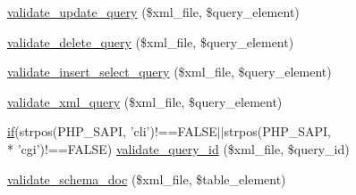 \begin{DoxyCompactItemize}
\item 
\hyperlink{validate_8php_af9c61a8b17e64da32042acf1f10a749e}{validate\+\_\+update\+\_\+query} (\$xml\+\_\+file, \$query\+\_\+element)
\item 
\hyperlink{validate_8php_a6cb78680a29c3df75fc0a7e083fb5b41}{validate\+\_\+delete\+\_\+query} (\$xml\+\_\+file, \$query\+\_\+element)
\item 
\hyperlink{validate_8php_ae38b9dcf816905b7fd3c4aeeeb4bfb27}{validate\+\_\+insert\+\_\+select\+\_\+query} (\$xml\+\_\+file, \$query\+\_\+element)
\item 
\hyperlink{validate_8php_a208d0609e6ad89408ad82c71b30e8611}{validate\+\_\+xml\+\_\+query} (\$xml\+\_\+file, \$query\+\_\+element)
\item 
\hyperlink{point__level__icon_8addon_8php_a29031816e50a8f742422e671b2bef9b2}{if}(strpos(P\+H\+P\+\_\+\+S\+A\+P\+I, 'cli')!==F\+A\+L\+S\+E$\vert$$\vert$strpos(P\+H\+P\+\_\+\+S\+A\+P\+I, \\*
'cgi')!==F\+A\+L\+S\+E) \hyperlink{validate_8php_a32e0113d5079fdbd81dc9d69ff2c5ee6}{validate\+\_\+query\+\_\+id} (\$xml\+\_\+file, \$query\+\_\+id)
\item 
\hyperlink{validate_8php_ae55c7ee778b9cb10a5bf33a3047c5586}{validate\+\_\+schema\+\_\+doc} (\$xml\+\_\+file, \$table\+\_\+element)
\end{DoxyCompactItemize}
